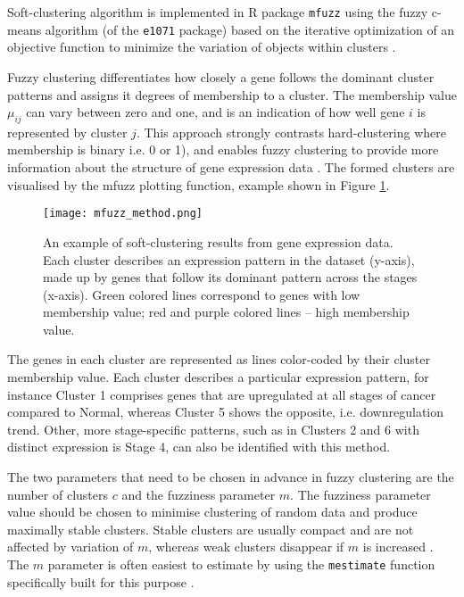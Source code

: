Soft-clustering algorithm is implemented in R package \texttt{mfuzz} \cite{Kumar2007Mfuzz:Data}  using the fuzzy c-means algorithm (of the \texttt{e1071} package) based on the iterative optimization of an
objective function to minimize the variation of objects within clusters  \cite{Bezdek1981PatternAlgorithms}.
 
Fuzzy clustering differentiates how closely a gene follows the dominant cluster patterns and assigns it degrees of membership to a cluster. The membership value $\mu_{ij}$ can vary between zero and one, and is an indication of how well gene $i$ is represented by cluster $j$. This approach strongly contrasts hard-clustering where membership is binary i.e. 0 or 1), and enables fuzzy clustering to provide more information about the structure of gene expression data \cite{Kumar2007Mfuzz:Data}. 
The formed clusters are visualised by the mfuzz plotting function, example shown in Figure \ref{fig:mfuzzmethod}. 

            \begin{figure}[h]
            \centering
            \texttt{[image: mfuzz\_method.png]}
            \caption{An example of soft-clustering results from gene expression data. Each cluster describes an expression pattern in the dataset (y-axis), made up by genes that follow its dominant pattern across the stages (x-axis).  Green colored lines correspond to genes with low membership value; red and purple colored lines -- high membership value.              
            }
            \label{fig:mfuzzmethod}
            \end{figure}
            
 The genes in each cluster are represented as lines color-coded by their cluster membership value.  Each cluster describes a particular expression pattern, for instance Cluster 1 comprises genes that are upregulated at all stages of cancer compared to Normal, whereas Cluster 5 shows the opposite, i.e. downregulation trend. Other, more stage-specific patterns, such as in Clusters 2 and 6 with distinct expression is Stage 4, can also be identified with this method. 
 
  
The two parameters that need to be chosen in advance in fuzzy clustering are the number of clusters $c$ and the fuzziness parameter $m$. The fuzziness parameter value should be chosen to minimise clustering of random data and produce maximally stable clusters. Stable clusters are usually compact and are not affected by variation of $m$, whereas weak clusters disappear if $m$ is increased \cite{Kumar2007Mfuzz:Data}. The $m$ parameter is often easiest to estimate by using the \texttt{mestimate} function specifically built for this purpose \cite{Schwammle2010AAnalysis}. 
 
